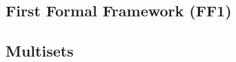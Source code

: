 \documentclass{article}
\begin{document}
\begin{appendices}


\section{First Formal Framework (FF1)} \label{a-ff1}


\subsection{Multisets} \label{a-ff1-multiset}


\end{appendices}
\end{document}
